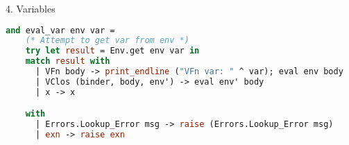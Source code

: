 \documentclass{l4proj}
\begin{document}
4. Variables

\begin{lstlisting}[language=Caml, caption=The PyFunc interpreter's rule for variables.]
and eval_var env var =
    (* Attempt to get var from env *)
    try let result = Env.get env var in
    match result with
      | VFn body -> print_endline ("VFn var: " ^ var); eval env body
      | VClos (binder, body, env') -> eval env' body
      | x -> x

    with
      | Errors.Lookup_Error msg -> raise (Errors.Lookup_Error msg)
      | exn -> raise exn
\end{lstlisting}











\end{document}
